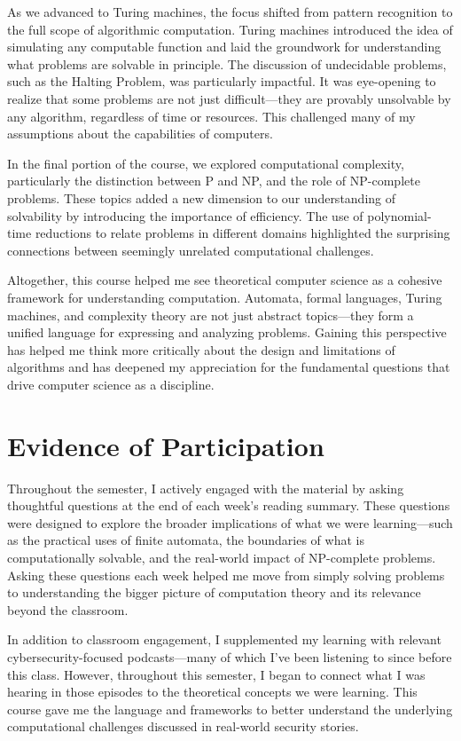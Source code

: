 \documentclass{article}
\theoremstyle{theorem}
\theoremstyle{definition}
\theoremstyle{remark}
\begin{document}
As we advanced to Turing machines, the focus shifted from pattern recognition to the full scope of algorithmic computation. Turing machines introduced the idea of simulating any computable function and laid the groundwork for understanding what problems are solvable in principle. The discussion of undecidable problems, such as the Halting Problem, was particularly impactful. It was eye-opening to realize that some problems are not just difficult—they are provably unsolvable by any algorithm, regardless of time or resources. This challenged many of my assumptions about the capabilities of computers.

In the final portion of the course, we explored computational complexity, particularly the distinction between P and NP, and the role of NP-complete problems. These topics added a new dimension to our understanding of solvability by introducing the importance of efficiency. The use of polynomial-time reductions to relate problems in different domains highlighted the surprising connections between seemingly unrelated computational challenges.

Altogether, this course helped me see theoretical computer science as a cohesive framework for understanding computation. Automata, formal languages, Turing machines, and complexity theory are not just abstract topics—they form a unified language for expressing and analyzing problems. Gaining this perspective has helped me think more critically about the design and limitations of algorithms and has deepened my appreciation for the fundamental questions that drive computer science as a discipline.

\section{Evidence of Participation}

Throughout the semester, I actively engaged with the material by asking thoughtful questions at the end of each week's reading summary. These questions were designed to explore the broader implications of what we were learning—such as the practical uses of finite automata, the boundaries of what is computationally solvable, and the real-world impact of NP-complete problems. Asking these questions each week helped me move from simply solving problems to understanding the bigger picture of computation theory and its relevance beyond the classroom.

In addition to classroom engagement, I supplemented my learning with relevant cybersecurity-focused podcasts—many of which I’ve been listening to since before this class. However, throughout this semester, I began to connect what I was hearing in those episodes to the theoretical concepts we were learning. This course gave me the language and frameworks to better understand the underlying computational challenges discussed in real-world security stories.
\end{document}
